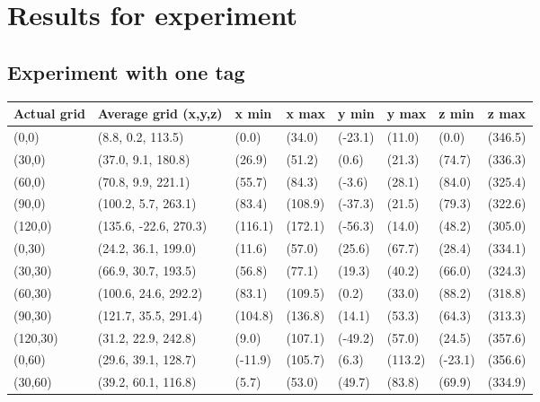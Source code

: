 \section{Results for experiment}
\label{app:experiment}

\subsection{Experiment with one tag}
\label{app:one-tag}
\begin{table}[H]
    \begin{tabular}{|l|l|l|l|l|l|l|l|}
        \hline
        Actual grid & Average grid (x,y,z)  & x min   & x max   & y min   & y max   & z min   & z max   \\ \hline
        (0,0)       & (8.8, 0.2, 113.5)     & (0.0)   & (34.0)  & (-23.1) & (11.0)  & (0.0)   & (346.5) \\ \hline
        (30,0)      & (37.0, 9.1, 180.8)    & (26.9)  & (51.2)  & (0.6)   & (21.3)  & (74.7)  & (336.3) \\ \hline
        (60,0)      & (70.8, 9.9, 221.1)    & (55.7)  & (84.3)  & (-3.6)  & (28.1)  & (84.0)  & (325.4) \\ \hline
        (90,0)      & (100.2, 5.7, 263.1)   & (83.4)  & (108.9) & (-37.3) & (21.5)  & (79.3)  & (322.6) \\ \hline
        (120,0)     & (135.6, -22.6, 270.3) & (116.1) & (172.1) & (-56.3) & (14.0)  & (48.2)  & (305.0) \\ \hline
        (0,30)      & (24.2, 36.1, 199.0)   & (11.6)  & (57.0)  & (25.6)  & (67.7)  & (28.4)  & (334.1) \\ \hline
        (30,30)     & (66.9, 30.7, 193.5)   & (56.8)  & (77.1)  & (19.3)  & (40.2)  & (66.0)  & (324.3) \\ \hline
        (60,30)     & (100.6, 24.6, 292.2)  & (83.1)  & (109.5) & (0.2)   & (33.0)  & (88.2)  & (318.8) \\ \hline
        (90,30)     & (121.7, 35.5, 291.4)  & (104.8) & (136.8) & (14.1)  & (53.3)  & (64.3)  & (313.3) \\ \hline
        (120,30)    & (31.2, 22.9, 242.8)   & (9.0)   & (107.1) & (-49.2) & (57.0)  & (24.5)  & (357.6) \\ \hline
        (0,60)      & (29.6, 39.1, 128.7)   & (-11.9) & (105.7) & (6.3)   & (113.2) & (-23.1) & (356.6) \\ \hline
        (30,60)     & (39.2, 60.1, 116.8)   & (5.7)   & (53.0)  & (49.7)  & (83.8)  & (69.9)  & (334.9) \\ \hline

\end{tabular}
\end{table}
